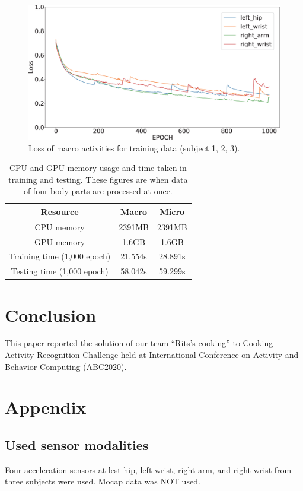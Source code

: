 \documentclass{svmult}
\begin{document}
\begin{figure}[h]
\sidecaption[t]
\includegraphics[width=0.75\linewidth]{Loss_micro}
\caption{Loss of macro activities for training data (subject 1, 2, 3).}
\label{fig:loss_recipe}
\end{figure}

\begin{table}[!h]
    \centering
    \begin{tabular}{c|c|c}\hline\hline
         Resource& Macro & Micro  \\\hline
         CPU memory& 2391MB &2391MB\\
         GPU memory& 1.6GB& 1.6GB\\
         Training time (1,000 epoch)& 21.554s & 28.891s \\
         Testing time (1,000 epoch)& 58.042s & 59.299s \\\hline
    \end{tabular}
    \caption{CPU and GPU memory usage and time taken in training and testing. These figures are when data of four body parts are processed at once.}
    \label{tab:resources}
\end{table}


\section{Conclusion}
\label{sec:conclusion}
This paper reported the solution of our team ``Rits's cooking'' to Cooking Activity Recognition Challenge held at International Conference on Activity and Behavior Computing (ABC2020).

\section*{Appendix}
\subsection*{Used sensor modalities}
Four acceleration sensors at lest hip, left wrist, right arm, and right wrist from three subjects were used. Mocap data was NOT used.
\end{document}
